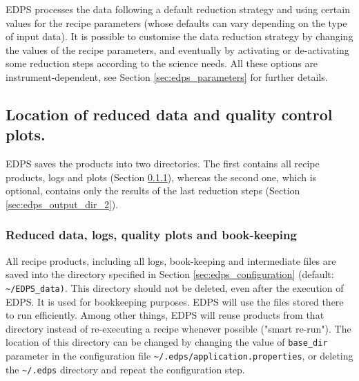 EDPS processes the data following a default reduction strategy and using certain values for the recipe parameters (whose defaults can vary depending on the type of input data). It is possible to customise the data reduction strategy by changing the values of the recipe parameters, and eventually by activating or de-activating some reduction steps according to the science needs. All these options are instrument-dependent, see Section \ref{sec:edps_parameters} for further details.


\subsection{Location of reduced data and quality control plots.}
\label{sec:edps_output_dir}


EDPS saves the products into two directories. The first contains all recipe  products, logs and plots (Section \ref{sec:edps_output_dir_1}), whereas the second one, which is optional, contains only the results of the last reduction steps (Section \ref{sec:edps_output_dir_2}).

\subsubsection{Reduced data, logs, quality plots and book-keeping}
\label{sec:edps_output_dir_1}
All recipe products, including all logs, book-keeping and intermediate files are saved into the directory specified in Section \ref{sec:edps_configuration} (default: {\tt \textasciitilde/EDPS\_data)}. This directory should not be deleted, even after the execution of EDPS. It is used for bookkeeping purposes. EDPS will use the files stored there to run efficiently. Among other things, EDPS will reuse products from that directory instead of re-executing a recipe whenever possible ("smart re-run").  The location of this directory can be changed by changing
the value of {\tt base\_dir} parameter in the configuration file {\tt \textasciitilde/.edps/application.properties}, or deleting the {\tt \textasciitilde/.edps} directory and repeat the configuration step. 





